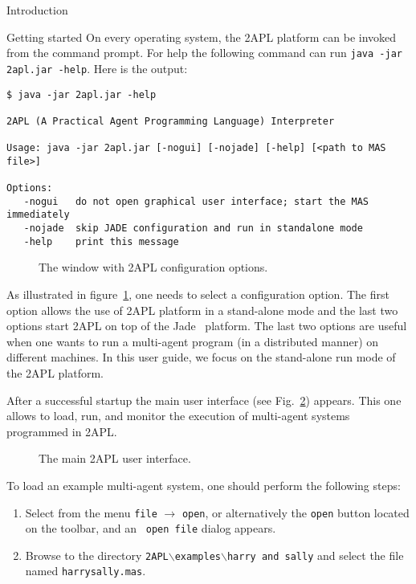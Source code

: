 \begin{chapter}{Introduction}
\begin{section}{Getting started}
On every operating system, the 2APL platform can be invoked from the
command prompt. For help the following command can run \texttt{java
-jar 2apl.jar -help}. Here is the output:
\begin{verbatim}
$ java -jar 2apl.jar -help

2APL (A Practical Agent Programming Language) Interpreter

Usage: java -jar 2apl.jar [-nogui] [-nojade] [-help] [<path to MAS file>]

Options:
   -nogui   do not open graphical user interface; start the MAS immediately
   -nojade  skip JADE configuration and run in standalone mode
   -help    print this message
\end{verbatim}

    \begin{figure}
        \begin{center}
            \caption{The window with 2APL configuration options.}\label{fig:configuration}
        \end{center}
    \end{figure}

As illustrated in figure~\ref{fig:configuration}, one needs to
select a configuration option. The first option allows the use of
2APL platform in a stand-alone mode and the last two options start
2APL on top of the Jade~\cite{jade2005} platform. The last two
options are useful when one wants to run a multi-agent program (in a
distributed manner) on different machines. In this user guide, we
focus on the stand-alone run mode of the 2APL platform.

After a successful startup the main user interface (see Fig.~\ref{fig:mainscreen}) appears.
This one allows to load, run, and monitor the
execution of multi-agent systems programmed in 2APL.

    \begin{figure}
        \begin{center}
            \caption{The main 2APL user interface.}\label{fig:mainscreen}
        \end{center}
    \end{figure}

To load an example multi-agent system, one should perform the
following steps:
\begin{enumerate}
    \item Select from the menu {\tt file} $\rightarrow$ {\tt open}, or
    alternatively the {\tt open} button located on the toolbar, and an {\tt
    open file} dialog appears.
    \item Browse to the directory {\tt 2APL}$\backslash${\tt examples}$\backslash${\tt harry and sally} and
    select the file named {\tt harrysally.mas}.
\end{enumerate}


\end{section}
\end{chapter}
